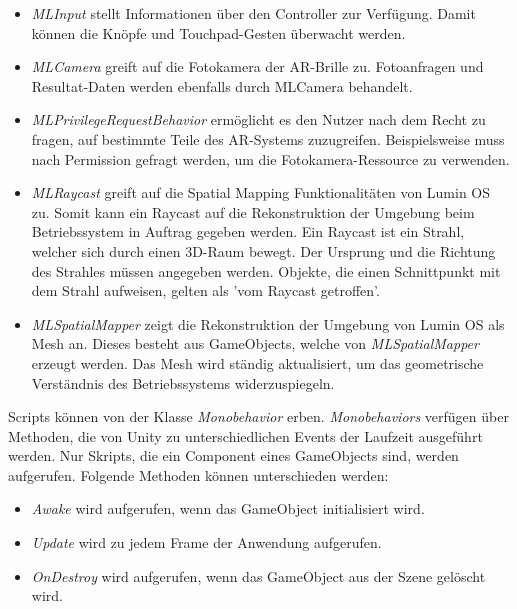 \begin{itemize}
	\item \textit{MLInput} stellt Informationen über den Controller zur Verfügung. Damit können die Knöpfe und Touchpad-Gesten überwacht werden.\citep{mlinput}
	\item \textit{MLCamera} greift auf die Fotokamera der AR-Brille zu. Fotoanfragen und Resultat-Daten werden ebenfalls durch MLCamera behandelt.
	\item \textit{MLPrivilegeRequestBehavior} ermöglicht es den Nutzer nach dem Recht zu fragen, auf bestimmte Teile des AR-Systems zuzugreifen. Beispielsweise muss nach Permission gefragt werden, um die Fotokamera-Ressource zu verwenden.\citep{mlprivileges}
	\item \textit{MLRaycast} greift auf die Spatial Mapping Funktionalitäten von Lumin OS zu. Somit kann ein Raycast auf die Rekonstruktion der Umgebung beim Betriebssystem in Auftrag gegeben werden. Ein Raycast ist ein Strahl, welcher sich durch einen 3D-Raum bewegt. Der Ursprung und die Richtung des Strahles müssen angegeben werden. Objekte, die einen Schnittpunkt mit dem Strahl aufweisen, gelten als 'vom Raycast getroffen'.\citep{unityraycast,mlraycast}
	\item \textit{MLSpatialMapper} zeigt die Rekonstruktion der Umgebung von Lumin OS als Mesh an. Dieses besteht aus GameObjects, welche von \textit{MLSpatialMapper} erzeugt werden. Das Mesh wird ständig aktualisiert, um das geometrische Verständnis des Betriebssystems widerzuspiegeln.\citep{mlluminworldreconstruktion,mlmeshingunity}
\end{itemize}

Scripts können von der Klasse \textit{Monobehavior} erben. \textit{Monobehaviors} verfügen über Methoden, die von Unity zu unterschiedlichen Events der Laufzeit ausgeführt werden. Nur Skripts, die ein Component eines GameObjects sind, werden aufgerufen. Folgende Methoden können unterschieden werden:

\begin{itemize}
	\item \textit{Awake} wird aufgerufen, wenn das GameObject initialisiert wird. %
	\item \textit{Update} wird zu jedem Frame der Anwendung aufgerufen.
	\item \textit{OnDestroy} wird aufgerufen, wenn das GameObject aus der Szene gelöscht wird.
\end{itemize}

